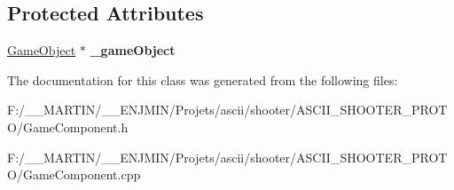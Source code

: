 \subsection*{Protected Attributes}
\begin{DoxyCompactItemize}
\item 
\hypertarget{class_game_component_af36779887688a4f6db73e3d594c0e516}{}\label{class_game_component_af36779887688a4f6db73e3d594c0e516} 
\hyperlink{class_game_object}{Game\+Object} $\ast$ {\bfseries \+\_\+game\+Object}
\end{DoxyCompactItemize}


The documentation for this class was generated from the following files\+:\begin{DoxyCompactItemize}
\item 
F\+:/\+\_\+\+\_\+\+M\+A\+R\+T\+I\+N/\+\_\+\+\_\+\+E\+N\+J\+M\+I\+N/\+Projets/ascii/shooter/\+A\+S\+C\+I\+I\+\_\+\+S\+H\+O\+O\+T\+E\+R\+\_\+\+P\+R\+O\+T\+O/Game\+Component.\+h\item 
F\+:/\+\_\+\+\_\+\+M\+A\+R\+T\+I\+N/\+\_\+\+\_\+\+E\+N\+J\+M\+I\+N/\+Projets/ascii/shooter/\+A\+S\+C\+I\+I\+\_\+\+S\+H\+O\+O\+T\+E\+R\+\_\+\+P\+R\+O\+T\+O/Game\+Component.\+cpp\end{DoxyCompactItemize}
